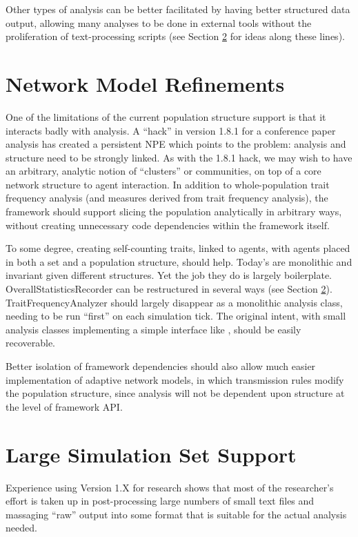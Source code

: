 \documentclass[pdftex,letterpaper,rmp,groupedaddress,floatfix]{revtex4}
\begin{document}
Other types of analysis can be better facilitated by having better structured data output, allowing many analyses to be done in external tools without the proliferation of text-processing scripts (see Section \ref{sec:large-sim-support} for ideas along these lines).

\section{Network Model Refinements}
One of the limitations of the current population structure support is that it interacts badly with analysis.  A ``hack'' in version 1.8.1 for a conference paper analysis has created a persistent NPE which points to the problem:  analysis and structure need to be strongly linked.  As with the 1.8.1 hack, we may wish to have an arbitrary, analytic notion of ``clusters'' or communities, on top of a core network structure to agent interaction.  In addition to whole-population trait frequency analysis (and measures derived from trait frequency analysis), the framework should support slicing the population analytically in arbitrary ways, without creating unnecessary code dependencies within the framework itself.  

To some degree, creating self-counting traits, linked to agents, with agents placed in both a set and a population structure, should help.  Today's  are monolithic and invariant given different structures.  Yet the job they do is largely boilerplate.  OverallStatisticsRecorder can be restructured in several ways (see Section \ref{sec:large-sim-support}).  TraitFrequencyAnalyzer should largely disappear as a monolithic analysis class, needing to be run ``first'' on each simulation tick.  The original intent, with small analysis classes implementing a simple interface like , should be easily recoverable.  

Better isolation of framework dependencies should also allow much easier implementation of adaptive network models, in which transmission rules modify the population structure, since analysis will not be dependent upon structure at the level of framework API.  

\section{Large Simulation Set Support}\label{sec:large-sim-support}
Experience using \tl Version 1.X for research shows that most of the researcher's effort is taken up in post-processing large numbers of small text files and massaging ``raw'' output into some format that is suitable for the actual analysis needed.  
\end{document}
